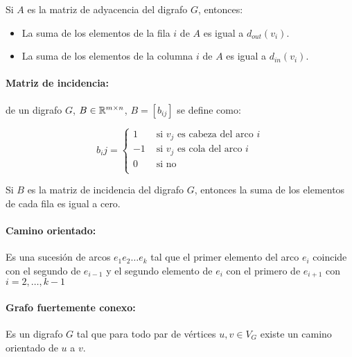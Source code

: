 \begin{proposicion}
	Si \(A\) es la matriz de adyacencia del digrafo \(G\), entonces:
	\begin{itemize}
		\item La suma de los elementos de la fila \(i\) de \(A\) es igual a \(d_{out}(v_i)\).
		\item La suma de los elementos de la columna \(i\) de \(A\) es igual a \(d_{in}(v_i)\).
	\end{itemize}
\end{proposicion}

\paragraph{Matriz de incidencia:} de un digrafo \(G\), \(B\in\mathbb{R}^{m\times n}\), \(B = [b_{ij}]\) se define como:

\[b_ij = \begin{cases}
		1  & \text{ si } v_j \text{ es cabeza del arco } i \\
		-1 & \text{ si } v_j \text{ es cola del arco } i   \\
		0  & \text{ si no }                                \\
	\end{cases}\]

\begin{proposicion}
	Si \(B\) es la matriz de incidencia del digrafo \(G\), entonces la suma de los elementos de cada fila es igual a cero.
\end{proposicion}

\paragraph{Camino orientado:} Es una sucesión de arcos \(e_1e_2\dots e_k\) tal que el primer elemento del arco \(e_i\) coincide con el segundo de \(e_{i-1}\) y el segundo elemento de \(e_i\) con el primero de \(e_{i+1}\) con \(i = 2,\dots,k-1\)

\paragraph{Grafo fuertemente conexo:} Es un digrafo \(G\) tal que para todo par de vértices \(u,v\in 	V_G\) existe un camino orientado de \(u\) a \(v\).
